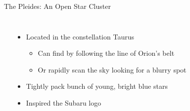 \documentclass[pdf, ]{beamer}
\begin{document}
\begin{frame}{The Pleides: An Open Star Cluster}
\begin{columns}
\begin{center}
		\end{center}
		\begin{itemize}
			\item Located in the constellation Taurus
				\begin{itemize}
					\item Can find by following the line of Orion's belt
					\item Or rapidly scan the sky looking for a blurry spot
				\end{itemize}
			\item Tightly pack bunch of young, bright blue stars
			\item Inspired the Subaru logo
		\end{itemize}
	\end{columns}
\end{frame}
\end{document}
